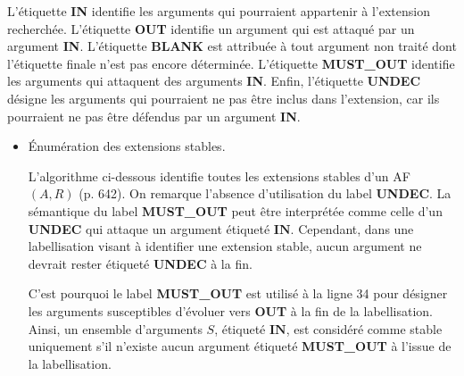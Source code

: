 \documentclass{rapportECL}
\begin{document}
L'étiquette \textbf{IN} identifie les arguments qui pourraient appartenir à  l'extension recherchée. L'étiquette \textbf{OUT} 
identifie un argument qui est attaqué par un argument \textbf{IN}. L'étiquette \textbf{BLANK} est attribuée à tout argument non 
traité dont l'étiquette finale n'est pas encore déterminée. L'étiquette \textbf{ {MUST\_OUT}} identifie les arguments qui attaquent des 
arguments \textbf{IN}. Enfin, l'étiquette \textbf{UNDEC} désigne les arguments qui pourraient ne pas être inclus dans  l'extension, car ils pourraient ne pas être défendus par un argument \textbf{IN}.


\begin{itemize}
    \item Énumération des extensions stables.
    
	L'algorithme ci-dessous identifie toutes les extensions stables d’un AF $(A, R)$ \cite{c} (p. 642). %
	On remarque l'absence d'utilisation du label \textbf{UNDEC}. La sémantique du label \textbf{MUST\_OUT} peut être interprétée comme celle 
	d'un \textbf{UNDEC} qui attaque un argument étiqueté \(\textbf{IN}\). 
	Cependant, dans une labellisation visant à identifier une extension stable, aucun argument ne devrait rester étiqueté \textbf{UNDEC} à 
	la fin. 

	C'est pourquoi le label \textbf{MUST\_OUT} est utilisé à la ligne 34 pour désigner les arguments susceptibles d'évoluer 
	vers \textbf{OUT} à la fin de la labellisation. Ainsi, un ensemble d'arguments \( S \), étiqueté \(\textbf{IN}\), est 
	considéré comme stable uniquement s'il n'existe aucun argument étiqueté \textbf{MUST\_OUT} à l'issue de la labellisation.


\end{itemize}
\end{document}
